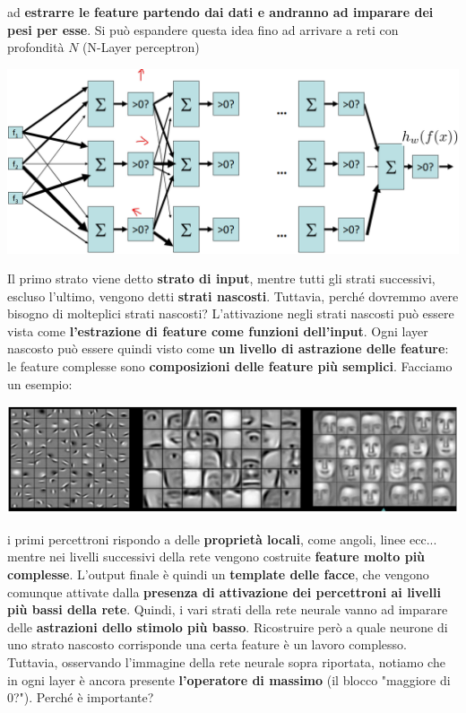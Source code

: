 \documentclass[12pt]{article}
\begin{document}
ad \textbf{estrarre le feature partendo dai dati e andranno ad imparare dei pesi per esse}. Si può espandere questa idea fino ad arrivare a reti con profondità $N$ (N-Layer perceptron)
\begin{center}
    \includegraphics[width =1\linewidth]{Images/109.PNG}
\end{center}
Il primo strato viene detto \textbf{strato di input}, mentre tutti gli strati successivi, escluso l'ultimo, vengono detti \textbf{strati nascosti}.
Tuttavia, perché dovremmo avere bisogno di molteplici strati nascosti?
L'attivazione negli strati nascosti può essere vista come \textbf{l'estrazione di feature come funzioni dell'input}.
Ogni layer nascosto può essere quindi visto come \textbf{un livello di astrazione delle feature}: le feature complesse sono \textbf{composizioni delle feature più semplici}.
Facciamo un esempio:
\begin{center}
    \includegraphics[width =1\linewidth]{Images/110.PNG}
\end{center}
i primi percettroni rispondo a delle \textbf{proprietà locali}, come angoli, linee ecc... mentre nei livelli successivi della rete vengono costruite \textbf{feature molto più complesse}. L'output finale è quindi un \textbf{template delle facce}, che vengono comunque
attivate dalla \textbf{presenza di attivazione dei percettroni ai livelli più bassi della rete}. Quindi, i vari strati della rete neurale vanno ad imparare delle \textbf{astrazioni dello stimolo più basso}. Ricostruire però a quale neurone di uno strato nascosto corrisponde una certa
feature è un lavoro complesso. Tuttavia, osservando l'immagine della rete neurale sopra riportata, notiamo che in ogni layer è ancora presente \textbf{l'operatore di massimo} (il blocco "maggiore di 0?"). Perché è importante?
\end{document}
